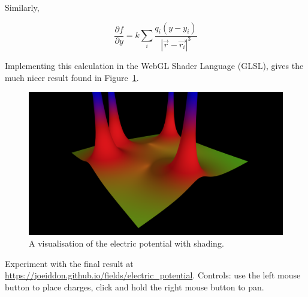 \documentclass{article} %
\begin{document}
Similarly,

$$\frac{\partial f}{\partial y} = k\sum_{i}\frac{q_i(y-y_i)}{|\vec{r}-\vec{r_i}|^3}$$

Implementing this calculation in the WebGL Shader Language (GLSL), gives the much nicer result found in Figure~\ref{fig:shading}.

\begin{figure}
\includegraphics[width=\linewidth]{shading.png}
\caption{A visualisation of the electric potential with shading.}
\label{fig:shading}
\end{figure}

\vfill
Experiment with the final result at \url{https://joeiddon.github.io/fields/electric_potential}. Controls: use the left mouse button to place charges, click and hold the right mouse button to pan.
\end{document}

